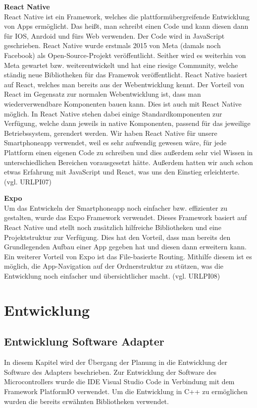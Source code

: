 \documentclass[11pt, twoside]{article}
\begin{document}
\textbf{React Native} \\
React Native ist ein Framework, welches die plattformübergreifende Entwicklung von Apps ermöglicht. Das heißt, man schreibt einen Code und kann diesen dann für IOS, Anrdoid und fürs Web verwenden. Der Code wird in JavaScript geschrieben. React Native wurde erstmals 2015 von Meta (damals noch Facebook) als Open-Source-Projekt veröffentlicht. Seither wird es weiterhin von Meta gewartet bzw. weiterentwickelt und hat eine riesige Community, welche ständig neue Bibliotheken für das Framewok veröffentlicht. React Native basiert auf React, welches man bereits aus der Webentwicklung kennt. Der Vorteil von React im Gegensatz zur normalen Webentwicklung ist, dass man wiederverwendbare Komponenten bauen kann. Dies ist auch mit React Native möglich. In React Native stehen dabei einige Standardkomponenten zur Verfügung, welche dann jeweils in native Komponenten, passend für das jeweilige Betriebssystem, gerendert werden. 
Wir haben React Native für unsere Smartphoneapp verwendet, weil es sehr aufwendig gewesen wäre, für jede Plattform einen eigenen Code zu schreiben und dies außerdem sehr viel Wissen in unterschiedlichen Bereichen vorausgesetzt hätte. Außerdem hatten wir auch schon etwas Erfahrung mit JavaScript und React, was uns den Einstieg erleichterte.
(vgl. URLPI07)

\textbf{Expo} \\
Um das Entwickeln der Smartphoneapp noch einfacher bzw. effizienter zu gestalten, wurde das Expo Framework verwendet. Dieses Framework basiert auf React Native und stellt noch zusätzlich hilfreiche Bibliotheken und eine Projektstruktur zur Verfügung. Dies hat den Vorteil, dass man bereits den Grundlegenden Aufbau einer App gegeben hat und diesen dann erweitern kann. Ein weiterer Vorteil von Expo ist das File-basierte Routing. Mithilfe diesem ist es möglich, die App-Navigation auf der Ordnerstruktur zu stützen, was die Entwicklung noch einfacher und übersichtlicher macht.
(vgl. URLPI08)

\section{Entwicklung}
\subsection{Entwicklung Software Adapter}
In diesem Kapitel wird der Übergang der Planung in die Entwicklung der Software des Adapters beschrieben. 
Zur Entwicklung der Software des Microcontrollers wurde die IDE Visual Studio Code in Verbindung mit dem Framework PlatformIO verwendet. Um die Entwicklung in C++ zu ermöglichen wurden die bereits erwähnten Bibliotheken verwendet.
\end{document}
